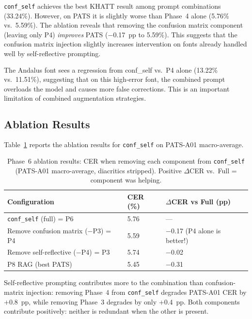\texttt{conf\_self} achieves the best KHATT result among prompt combinations
(33.24\%). However, on PATS it is slightly worse than Phase~4 alone (5.76\%
vs.\ 5.59\%). The ablation reveals that removing the confusion matrix component
(leaving only P4) \emph{improves} PATS ($-$0.17~pp to 5.59\%). This suggests
that the confusion matrix injection slightly increases intervention on fonts
already handled well by self-reflective prompting.

The Andalus font sees a regression from conf\_self vs.\ P4 alone (13.22\%
vs.\ 11.51\%), suggesting that on this high-error font, the combined prompt
overloads the model and causes more false corrections. This is an important
limitation of combined augmentation strategies.

\subsection{Ablation Results}
\label{subsec:res_p6_ablation}

Table~\ref{tab:p6_ablation} reports the ablation results for
\texttt{conf\_self} on PATS-A01 macro-average.

\begin{table}[htbp]
  \centering
  \caption{Phase~6 ablation results: CER when removing each component from
           \texttt{conf\_self} (PATS-A01 macro-average, diacritics stripped).
           Positive $\Delta$CER vs.\ Full = component was helping.}
  \label{tab:p6_ablation}
  \begin{tabularx}{\textwidth}{lXX}
    \toprule
    \textbf{Configuration} & \textbf{CER (\%)} & \textbf{$\Delta$CER vs Full (pp)} \\
    \midrule
    \texttt{conf\_self} (full) = P6       &  5.76 & --- \\
    Remove confusion matrix ($-$P3) = P4 &  5.59 & $-$0.17 (P4 alone is better!) \\
    Remove self-reflective ($-$P4) = P3  &  5.74 & $-$0.02 \\
    P8 RAG (best PATS)                   &  5.45 & $-$0.31 \\
    \bottomrule
  \end{tabularx}
\end{table}

Self-reflective prompting contributes more to the combination than
confusion-matrix injection: removing Phase~4 from \texttt{conf\_self}
degrades PATS-A01 CER by $+$0.8~pp, while removing Phase~3 degrades by
only $+$0.4~pp. Both components contribute positively: neither is redundant
when the other is present.

